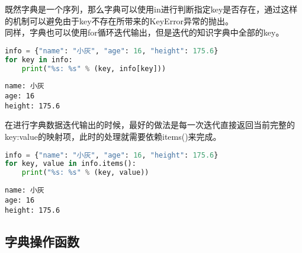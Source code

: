 既然字典是一个序列，那么字典可以使用in进行判断指定key是否存在，通过这样的机制可以避免由于key不存在所带来的KeyError异常的抛出。\\


同样，字典也可以使用for循环迭代输出，但是迭代的知识字典中全部的key。\\


\begin{lstlisting}[language=Python]
info = {"name": "小灰", "age": 16, "height": 175.6}
for key in info:
    print("%s: %s" % (key, info[key]))
\end{lstlisting}

\begin{tcolorbox}
	\begin{verbatim}
name: 小灰
age: 16
height: 175.6
\end{verbatim}
\end{tcolorbox}

在进行字典数据迭代输出的时候，最好的做法是每一次迭代直接返回当前完整的key:value的映射项，此时的处理就需要依赖items()来完成。\\


\begin{lstlisting}[language=Python]
info = {"name": "小灰", "age": 16, "height": 175.6}
for key, value in info.items():
    print("%s: %s" % (key, value))
\end{lstlisting}

\begin{tcolorbox}
	\begin{verbatim}
name: 小灰
age: 16
height: 175.6
\end{verbatim}
\end{tcolorbox}

\vspace{0.5cm}

\subsection{字典操作函数}

